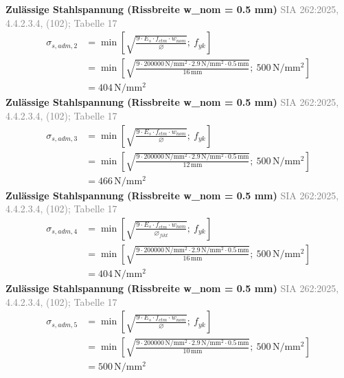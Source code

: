 \documentclass[11pt,a4paper]{article}
\newcommand{\normref}[1]{{\small\textcolor{gray}{#1}}}
\begin{document}
\noindent\textbf{Zulässige Stahlspannung (Rissbreite w\_nom = 0.5 mm)} \hfill \normref{SIA 262:2025, 4.4.2.3.4, (102); Tabelle 17}
\begin{equation*}
\begin{aligned}
  \sigma_{s,adm,2} &= \min\left[\sqrt{\frac{9 \cdot E_s \cdot f_{ctm} \cdot w_{nom}}{\varnothing}};\ f_{yk}\right] \\
  &= \min\left[\sqrt{\frac{9 \cdot 200000\,\mathrm{N}/\mathrm{mm}^{2} \cdot 2.9\,\mathrm{N}/\mathrm{mm}^{2} \cdot 0.5\,\mathrm{mm}}{16\,\mathrm{mm}}};\ 500\,\mathrm{N}/\mathrm{mm}^{2}\right] \\
  &= 404\,\mathrm{N}/\mathrm{mm}^{2}
\end{aligned}
\end{equation*}
\noindent\textbf{Zulässige Stahlspannung (Rissbreite w\_nom = 0.5 mm)} \hfill \normref{SIA 262:2025, 4.4.2.3.4, (102); Tabelle 17}
\begin{equation*}
\begin{aligned}
  \sigma_{s,adm,3} &= \min\left[\sqrt{\frac{9 \cdot E_s \cdot f_{ctm} \cdot w_{nom}}{\varnothing}};\ f_{yk}\right] \\
  &= \min\left[\sqrt{\frac{9 \cdot 200000\,\mathrm{N}/\mathrm{mm}^{2} \cdot 2.9\,\mathrm{N}/\mathrm{mm}^{2} \cdot 0.5\,\mathrm{mm}}{12\,\mathrm{mm}}};\ 500\,\mathrm{N}/\mathrm{mm}^{2}\right] \\
  &= 466\,\mathrm{N}/\mathrm{mm}^{2}
\end{aligned}
\end{equation*}
\noindent\textbf{Zulässige Stahlspannung (Rissbreite w\_nom = 0.5 mm)} \hfill \normref{SIA 262:2025, 4.4.2.3.4, (102); Tabelle 17}
\begin{equation*}
\begin{aligned}
  \sigma_{s,adm,4} &= \min\left[\sqrt{\frac{9 \cdot E_s \cdot f_{ctm} \cdot w_{nom}}{\varnothing_{fikt}}};\ f_{yk}\right] \\
  &= \min\left[\sqrt{\frac{9 \cdot 200000\,\mathrm{N}/\mathrm{mm}^{2} \cdot 2.9\,\mathrm{N}/\mathrm{mm}^{2} \cdot 0.5\,\mathrm{mm}}{16\,\mathrm{mm}}};\ 500\,\mathrm{N}/\mathrm{mm}^{2}\right] \\
  &= 404\,\mathrm{N}/\mathrm{mm}^{2}
\end{aligned}
\end{equation*}
\noindent\textbf{Zulässige Stahlspannung (Rissbreite w\_nom = 0.5 mm)} \hfill \normref{SIA 262:2025, 4.4.2.3.4, (102); Tabelle 17}
\begin{equation*}
\begin{aligned}
  \sigma_{s,adm,5} &= \min\left[\sqrt{\frac{9 \cdot E_s \cdot f_{ctm} \cdot w_{nom}}{\varnothing}};\ f_{yk}\right] \\
  &= \min\left[\sqrt{\frac{9 \cdot 200000\,\mathrm{N}/\mathrm{mm}^{2} \cdot 2.9\,\mathrm{N}/\mathrm{mm}^{2} \cdot 0.5\,\mathrm{mm}}{10\,\mathrm{mm}}};\ 500\,\mathrm{N}/\mathrm{mm}^{2}\right] \\
  &= 500\,\mathrm{N}/\mathrm{mm}^{2}
\end{aligned}
\end{equation*}
\end{document}
